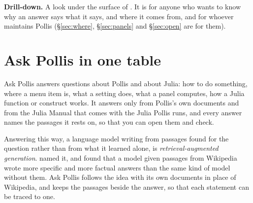 \begin{nbox}
{\color{amber}\bfseries Drill-down.}\enspace
A look under the surface of . It is for anyone who wants to know why an answer says what
it says, and where it comes from, and for whoever maintains Pollis (\S\ref{sec:where}, \S\ref{sec:panels} and
\S\ref{sec:open} are for them).
\end{nbox}

\tableofcontents

\section{Ask Pollis in one table}

Ask Pollis answers questions about Pollis and about Julia: how to do something, where a menu item is, what a setting
does, what a panel computes, how a Julia function or construct works. It answers only from Pollis's own documents and
from the Julia Manual that comes with the Julia Pollis runs, and every answer names the passages it rests on, so that
you can open them and check.

Answering this way, a language model writing from passages found for the question rather than from what it learned
alone, is \emph{retrieval-augmented generation}.  named it, and
found that a model given passages from Wikipedia wrote more specific and more factual answers than the same kind of
model without them. Ask Pollis follows the idea with its own documents in place of Wikipedia, and keeps the passages
beside the answer, so that each statement can be traced to one.

